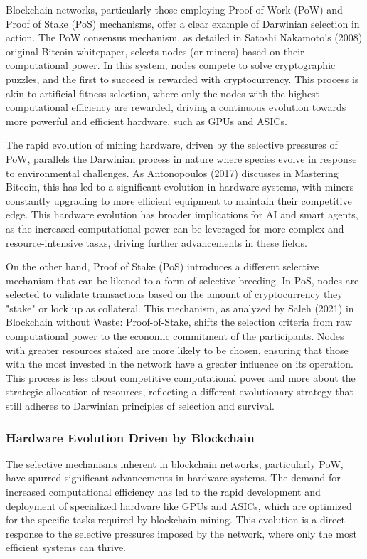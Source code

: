 \documentclass[12pt,twoside]{article}
\begin{document}
Blockchain networks, particularly those employing Proof of Work (PoW) and Proof of Stake (PoS) mechanisms, offer a clear example of Darwinian selection in action. The PoW consensus mechanism, as detailed in Satoshi Nakamoto’s (2008) original Bitcoin whitepaper, selects nodes (or miners) based on their computational power. In this system, nodes compete to solve cryptographic puzzles, and the first to succeed is rewarded with cryptocurrency. This process is akin to artificial fitness selection, where only the nodes with the highest computational efficiency are rewarded, driving a continuous evolution towards more powerful and efficient hardware, such as GPUs and ASICs.

The rapid evolution of mining hardware, driven by the selective pressures of PoW, parallels the Darwinian process in nature where species evolve in response to environmental challenges. As Antonopoulos (2017) discusses in Mastering Bitcoin, this has led to a significant evolution in hardware systems, with miners constantly upgrading to more efficient equipment to maintain their competitive edge. This hardware evolution has broader implications for AI and smart agents, as the increased computational power can be leveraged for more complex and resource-intensive tasks, driving further advancements in these fields.

On the other hand, Proof of Stake (PoS) introduces a different selective mechanism that can be likened to a form of selective breeding. In PoS, nodes are selected to validate transactions based on the amount of cryptocurrency they "stake" or lock up as collateral. This mechanism, as analyzed by Saleh (2021) in Blockchain without Waste: Proof-of-Stake, shifts the selection criteria from raw computational power to the economic commitment of the participants. Nodes with greater resources staked are more likely to be chosen, ensuring that those with the most invested in the network have a greater influence on its operation. This process is less about competitive computational power and more about the strategic allocation of resources, reflecting a different evolutionary strategy that still adheres to Darwinian principles of selection and survival.

\subsubsection{Hardware Evolution Driven by Blockchain}

The selective mechanisms inherent in blockchain networks, particularly PoW, have spurred significant advancements in hardware systems. The demand for increased computational efficiency has led to the rapid development and deployment of specialized hardware like GPUs and ASICs, which are optimized for the specific tasks required by blockchain mining. This evolution is a direct response to the selective pressures imposed by the network, where only the most efficient systems can thrive.
\end{document}
